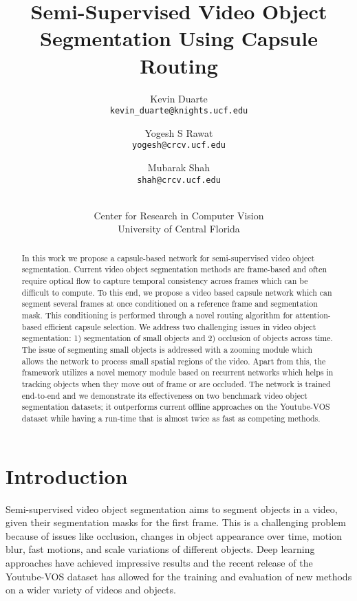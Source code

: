 \documentclass[10pt,twocolumn,letterpaper]{article}
\begin{document}
\title{Semi-Supervised Video Object Segmentation Using Capsule Routing}
\author{
Kevin Duarte\\
{\tt\small kevin\_duarte@knights.ucf.edu}
\and 
Yogesh S Rawat\\
{\tt\small yogesh@crcv.ucf.edu}
\and 
Mubarak Shah\\
{\tt\small shah@crcv.ucf.edu}\\
\and \\
Center for Research in Computer Vision\\
University of Central Florida
}


\maketitle



\begin{abstract}


In this work we propose a capsule-based network for semi-supervised video object segmentation. Current video object segmentation methods are frame-based and often require optical flow to capture temporal consistency across frames which can be difficult to compute. To this end, we propose a video based capsule network which can segment several frames at once conditioned on a reference frame and segmentation mask. This conditioning is performed through a novel routing algorithm for attention-based efficient capsule selection. We address two challenging issues in video object segmentation: 1) segmentation of small objects and 2) occlusion of objects across time. The issue of segmenting small objects is addressed with a zooming module which allows the network to process small spatial regions of the video. Apart from this, the framework utilizes a novel memory module based on recurrent networks which helps in tracking objects when they move out of frame or are occluded. The network is trained end-to-end and we demonstrate its effectiveness on two benchmark video object segmentation datasets; it outperforms current offline approaches on the Youtube-VOS dataset while having a run-time that is almost twice as fast as competing methods.
\end{abstract}

\section{Introduction}

Semi-supervised video object segmentation aims to segment objects in a video,  given their segmentation masks for the first frame. This is a challenging problem because of issues like occlusion, changes in object appearance over time, motion blur, fast motions, and scale variations of different objects. Deep learning approaches have achieved impressive results and the recent release of the Youtube-VOS dataset \cite{xu2018youtube2} has allowed for the training and evaluation of new methods on a wider variety of videos and objects.
\end{document}
